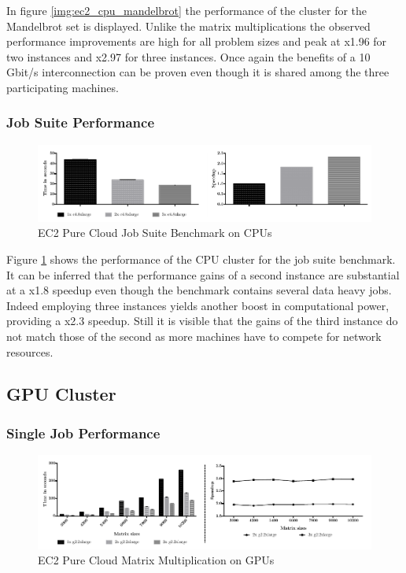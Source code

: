 In figure \ref{img:ec2_cpu_mandelbrot} the performance of the cluster for the Mandelbrot set is displayed. Unlike the matrix multiplications the observed performance improvements are high for all problem sizes and peak at x1.96 for two instances and x2.97 for three instances. Once again the benefits of a 10 Gbit/s interconnection can be proven even though it is shared among the three participating machines.
\subsubsection*{Job Suite Performance}

\begin{figure}[H]
	\includegraphics[width=1.0\textwidth]{images/ec2_cpu_full_benchmark.pdf}
	\centering
	\caption{EC2 Pure Cloud Job Suite Benchmark on CPUs}
	\label{img:ec2_cpu_full_benchmark}
\end{figure}

Figure \ref{img:ec2_cpu_full_benchmark} shows the performance of the CPU cluster for the job suite benchmark. It can be inferred that the performance gains of a second instance are substantial at a x1.8 speedup even though the benchmark contains several data heavy jobs. Indeed employing three instances yields another boost in computational power, providing a x2.3 speedup. Still it is visible that the gains of the third instance do not match those of the second as more machines have to compete for network resources.

\subsection{GPU Cluster}
\subsubsection*{Single Job Performance}

\begin{figure}[H]
	\includegraphics[width=1.0\textwidth]{images/ec2_gpu_matrix_multiplication.pdf}
	\centering
	\caption{EC2 Pure Cloud Matrix Multiplication on GPUs}
	\label{img:ec2_gpu_matrix_multiplication}
\end{figure}

